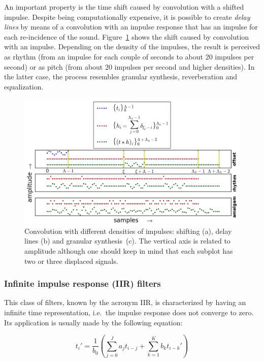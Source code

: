 An important property is the time shift caused by convolution with a shifted impulse. Despite being computationally expensive, it is possible to create \emph{delay lines} by means of a convolution with an impulse response that has an impulse for each re-incidence of the sound. Figure~\ref{fig:delays} shows the shift caused by convolution with an impulse. Depending on the density of the impulses, the result is perceived as rhythm (from an impulse for each couple of seconds to about 20 impulses per second) or as pitch (from about 20 impulses per second and higher densities). In the latter case, the process resembles granular synthesis, reverberation and equalization.

\begin{figure}
    \centering
        \includegraphics[width=\textwidth]{figures/delays_}
    \caption{Convolution with different densities of impulses: shifting (a), delay lines (b) and granular synthesis~(c).
    The vertical axis is related to amplitude although one should keep in mind that each subplot has two or three displaced signals.}
        \label{fig:delays}
\end{figure}

\subsubsection{Infinite impulse response (IIR) filters}
This class of filters, known by the acronym IIR, is characterized by having an infinite time representation, i.e.\ the impulse response does not converge to zero. Its application is usually made by the following equation:

\begin{equation}\label{eq:diferencas}
 t_i' = \frac{1}{b_0}\left ( \sum_{j=0}^Ja_j t_{i-j} + \sum_{k=1}^Kb_k t_{i-k}' \right )
\end{equation}

